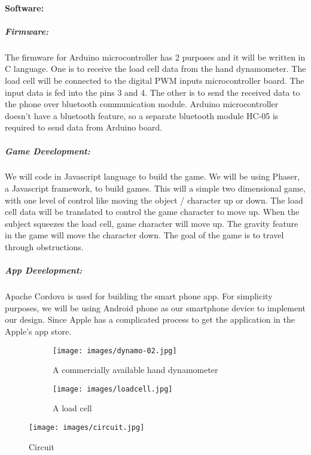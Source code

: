 \documentclass[12pt]{article}
\begin{document}
\paragraph{Software:}
 \subparagraph{Firmware:}
The firmware for Arduino microcontroller has 2 purposes and it will be written in C language. 
One is to receive the load cell data from the hand dynamometer. The load cell will be connected to the digital PWM inputs microcontroller board. The input data is  fed into the pins 3 and 4. 
 The other is to send the received data to the phone over bluetooth communication module. Arduino microcontroller doesn't have a  bluetooth feature, so a separate bluetooth module HC-05  is required to send data from Arduino board.

 
 \subparagraph{Game Development:}
 We will code in Javascript  language to build the game. We will be using Phaser, a Javascript framework, to build games. This will a simple two dimensional game, with one level of control like moving the object / character up or down. The load cell data will be translated to control the game character to move up. When the subject squeezes the load cell, game character will move up. The gravity feature in the game will move the character down. The goal of the game is to travel through obstructions.  
 
 \subparagraph{App Development:}
 Apache Cordova is used for building the smart phone app.  For simplicity purposes, we will be using Android phone as our smartphone device to implement our design. Since Apple has a complicated process to get the application in the Apple's app store. 
 
\begin{figure}

\begin{subfigure}{0.5\textwidth}
\texttt{[image: images/dynamo-02.jpg]}
\caption{A  commercially available hand dynamometer}
\label{fig:dynamo-02}
\end{subfigure}
\begin{subfigure}{0.5\textwidth}
\texttt{[image: images/loadcell.jpg]}
\caption{A load cell}
\label{fig:loadcell}
\end{subfigure}
\caption{}
\end{figure}

 	
 	\begin{figure}
 		\centering
 		\texttt{[image: images/circuit.jpg]}
 		\caption{Circuit}
 		\label{fig:circuit}
 	\end{figure}
\end{document}
